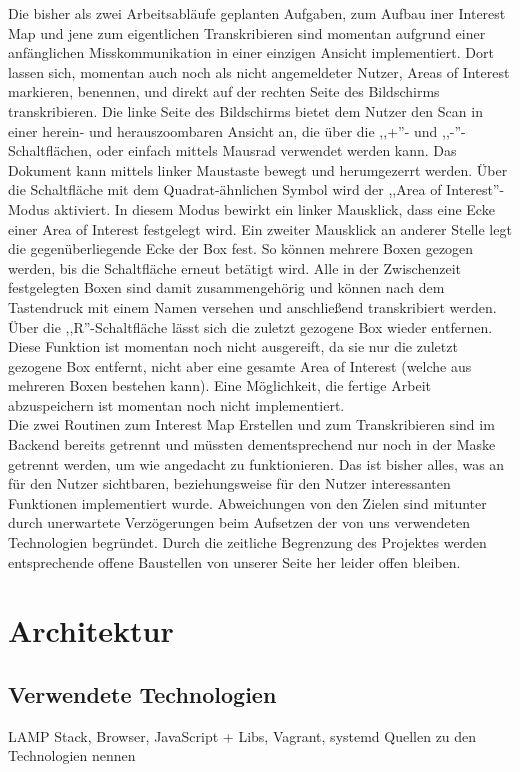 \documentclass{article}
\begin{document}
Die bisher als zwei Arbeitsabläufe geplanten Aufgaben, zum Aufbau iner Interest Map und jene zum eigentlichen Transkribieren sind momentan aufgrund einer anfänglichen Misskommunikation in einer einzigen Ansicht implementiert. Dort lassen sich, momentan auch noch als nicht angemeldeter Nutzer, Areas of Interest markieren, benennen, und direkt auf der rechten Seite des Bildschirms transkribieren. Die linke Seite des Bildschirms bietet dem Nutzer den Scan in einer herein- und herauszoombaren Ansicht an, die über die ,,+''- und ,,-''-Schaltflächen, oder einfach mittels Mausrad verwendet werden kann. Das Dokument kann mittels linker Maustaste bewegt und herumgezerrt werden. Über die Schaltfläche mit dem Quadrat-ähnlichen Symbol wird der ,,Area of Interest''-Modus aktiviert. In diesem Modus bewirkt ein linker Mausklick, dass eine Ecke einer Area of Interest festgelegt wird. Ein zweiter Mausklick an anderer Stelle legt die gegenüberliegende Ecke der Box fest. So können mehrere Boxen gezogen werden, bis die Schaltfläche erneut betätigt wird. Alle in der Zwischenzeit festgelegten Boxen sind damit zusammengehörig und können nach dem Tastendruck mit einem Namen versehen und anschließend transkribiert werden. Über die ,,R''-Schaltfläche lässt sich die zuletzt gezogene Box wieder entfernen. Diese Funktion ist momentan noch nicht ausgereift, da sie nur die zuletzt gezogene Box entfernt, nicht aber eine gesamte Area of Interest (welche aus mehreren Boxen bestehen kann). Eine Möglichkeit, die fertige Arbeit abzuspeichern ist momentan noch nicht implementiert. \\
Die zwei Routinen zum Interest Map Erstellen und zum Transkribieren sind im Backend bereits getrennt und müssten dementsprechend nur noch in der Maske getrennt werden, um wie angedacht zu funktionieren. Das ist bisher alles, was an für den Nutzer sichtbaren, beziehungsweise für den Nutzer interessanten Funktionen implementiert wurde. Abweichungen von den Zielen sind mitunter durch unerwartete Verzögerungen beim Aufsetzen der von uns verwendeten Technologien begründet. Durch die zeitliche Begrenzung des Projektes werden entsprechende offene Baustellen von unserer Seite her leider offen bleiben.


\section{Architektur}
\subsection{Verwendete Technologien}
LAMP Stack, Browser, JavaScript + Libs, Vagrant, systemd 
Quellen zu den Technologien nennen
\end{document}
